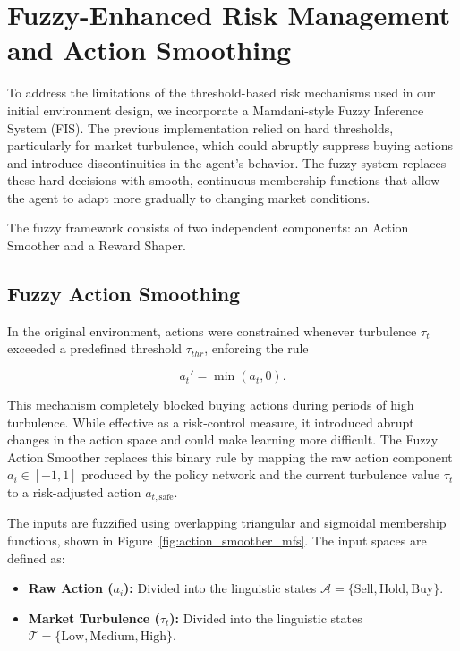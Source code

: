 \section{Fuzzy-Enhanced Risk Management and Action Smoothing}

To address the limitations of the threshold-based risk mechanisms used in our initial
environment design, we incorporate a Mamdani-style Fuzzy Inference System (FIS).
The previous implementation relied on hard thresholds, particularly for market
turbulence, which could abruptly suppress buying actions and introduce discontinuities
in the agent's behavior. The fuzzy system replaces these hard decisions with smooth,
continuous membership functions that allow the agent to adapt more gradually to changing
market conditions.

The fuzzy framework consists of two independent components: an Action Smoother and a
Reward Shaper.

\subsection{Fuzzy Action Smoothing}

In the original environment, actions were constrained whenever turbulence
$\tau_t$ exceeded a predefined threshold $\tau_{thr}$, enforcing the rule

\[
a_t' = \min(a_t, 0).
\]

This mechanism completely blocked buying actions during periods of high turbulence.
While effective as a risk-control measure, it introduced abrupt changes in the action
space and could make learning more difficult. The Fuzzy Action Smoother replaces this
binary rule by mapping the raw action component $a_i \in [-1,1]$ produced by the policy
network and the current turbulence value $\tau_t$ to a risk-adjusted action
$a_{t,\text{safe}}$.

The inputs are fuzzified using overlapping triangular and sigmoidal membership
functions, shown in Figure~\ref{fig:action_smoother_mfs}. The input spaces are defined as:

\begin{itemize}
    \item \textbf{Raw Action ($a_i$):} Divided into the linguistic states
    $\mathcal{A} = \{\text{Sell}, \text{Hold}, \text{Buy}\}$.
    
    \item \textbf{Market Turbulence ($\tau_t$):} Divided into the linguistic states
    $\mathcal{T} = \{\text{Low}, \text{Medium}, \text{High}\}$.
\end{itemize}

